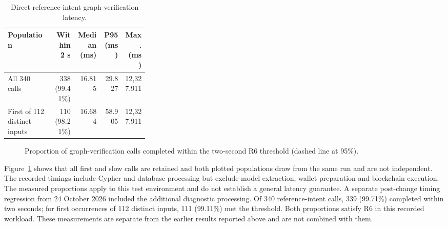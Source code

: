 \begin{table}[htbp]
\centering\small
\caption{Direct reference-intent graph-verification latency.}
\label{tab:results_graph_latency}
\begin{tabular}{p{0.32\linewidth}rrrr}
\hline
\textbf{Population} & \textbf{Within 2 s} & \textbf{Median (ms)} &
\textbf{P95 (ms)} & \textbf{Max. (ms)} \\
\hline
All 340 calls & 338 (99.41\%) & 16.815 & 29.827 & 12,327.911 \\
First of 112 distinct inputs & 110 (98.21\%) & 16.684 & 58.905 & 12,327.911 \\
\hline
\end{tabular}
\end{table}

\begin{figure}[H]
\centering
{}
\caption{Proportion of graph-verification calls completed within the two-second
R6 threshold (dashed line at 95\%).}
\label{fig:results_latency}
\end{figure}

Figure~\ref{fig:results_latency} shows that all first and slow calls are retained and both plotted populations draw from the same run and are not independent.
The recorded timings include Cypher and database processing but exclude
model extraction, wallet preparation and blockchain execution. The measured
proportions apply to this test environment and do not establish a general
latency guarantee. A separate post-change timing regression from 24 October 2026 included
the additional diagnostic processing. Of 340 reference-intent calls,
339 (99.71\%) completed within two seconds; for first occurrences of
112 distinct inputs, 111 (99.11\%) met the threshold. Both proportions
satisfy R6 in this recorded workload. These measurements are separate
from the earlier results reported above and are not combined with them.


